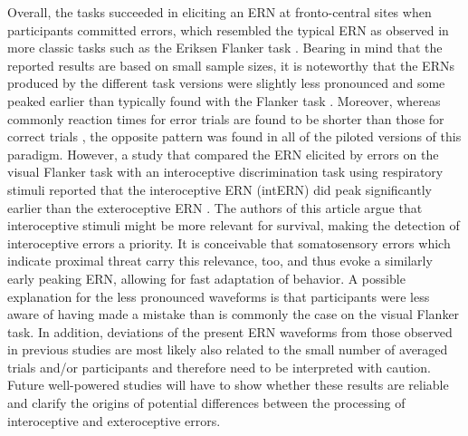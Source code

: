 \documentclass[twocolumn, serif, authordate, empirical]{jote-article}
\begin{document}
Overall, the tasks succeeded in eliciting an ERN at fronto-central sites when participants committed errors, which resembled the typical ERN as observed in more classic tasks such as the Eriksen Flanker task \parencite{Imburgio2020}. Bearing in mind that the reported results are based on small sample sizes, it is noteworthy that the ERNs produced by the different task versions were slightly less pronounced and some peaked earlier than typically found with the Flanker task \parencite{Hajcak2008}. Moreover, whereas commonly reaction times for error trials are found to be shorter than those for correct trials \parencite{Aarts2010, Imburgio2020}, the opposite pattern was found in all of the piloted versions of this paradigm. However, a study that compared the ERN elicited by errors on the visual Flanker task with an interoceptive discrimination task using respiratory stimuli reported that the interoceptive ERN (intERN) did peak significantly earlier than the exteroceptive ERN \parencite{Tan2019}. The authors of this article argue that interoceptive stimuli might be more relevant for survival, making the detection of interoceptive errors a priority. It is conceivable that somatosensory errors which indicate proximal threat carry this relevance, too, and thus evoke a similarly early peaking ERN, allowing for fast adaptation of behavior. A possible explanation for the less pronounced waveforms is that participants were less aware of having made a mistake than is commonly the case on the visual Flanker task. In addition, deviations of the present ERN waveforms from those observed in previous studies are most likely also related to the small number of averaged trials and/or participants \parencite{Kappenman2011} and therefore need to be interpreted with caution. Future well-powered studies will have to show whether these results are reliable and clarify the origins of potential differences between the processing of interoceptive and exteroceptive errors.
\end{document}
